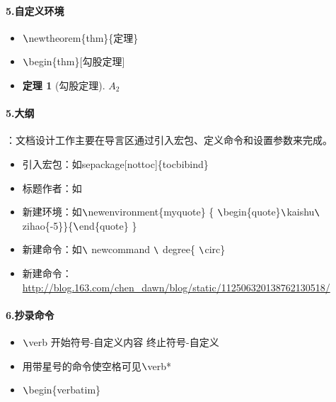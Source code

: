 \documentclass[UTF8,a4paper,8pt]{ctexart}
\newtheorem{thm}{定理}
\begin{document}
	\paragraph{5.自定义环境}
		\begin{itemize}
			\item  $\verb|\|$newtheorem\{thm\}\{定理\}
			\item  $\verb|\|$begin\{thm\}[勾股定理]
			\item  	\begin{thm}[勾股定理]
				$A_2$
			\end{thm}	
		\end{itemize}
	\paragraph{5.大纲}：文档设计工作主要在导言区通过引入宏包、定义命令和设置参数来完成。
		\begin{itemize}
			\item 引入宏包：如sepackage[nottoc]\{tocbibind\}
			\item 标题作者：如
			\item 新建环境：如$\verb|\|$newenvironment\{myquote\}
			\{
					$\verb|\|$begin\{quote\}$\verb|\|$kaishu$\verb|\|$zihao\{-5\}\}\{$\verb|\|$end\{quote\}
			\}
	
			\item 新建命令：如$\verb|\|$ newcommand $\verb|\|$ degree\{ $\verb|\|$circ\}
			\item 新建命令：\url{http://blog.163.com/chen_dawn/blog/static/112506320138762130518/}
			
		\end{itemize}                                                               
		
   \paragraph{6.抄录命令}
	   \begin{itemize}
		   	\item $\verb|\|$verb \quad 开始符号-自定义\quad 内容 \quad 终止符号-自定义
		   	\item 用带星号的命令使空格可见$\verb|\|$verb*
		   	\item $\verb|\|$begin\{verbatim\}
	   \end{itemize}
\end{document}
